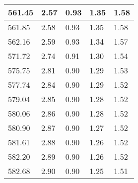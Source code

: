 \begin{table}[ht]
\begin{tabular}{|p{2.5cm}|p{2.5cm}|p{2.5cm}|p{2.5cm}|p{2.5cm}|}
        561.45                       & 2.57                         & 0.93                            & 1.35               & 1.58                            \\ \hline
        561.85                       & 2.58                         & 0.93                            & 1.35               & 1.58                            \\ \hline
        562.16                       & 2.59                         & 0.93                            & 1.34               & 1.57                            \\ \hline
        571.72                       & 2.74                         & 0.91                            & 1.30               & 1.54                            \\ \hline
        575.75                       & 2.81                         & 0.90                            & 1.29               & 1.53                            \\ \hline
        577.74                       & 2.84                         & 0.90                            & 1.29               & 1.52                            \\ \hline
        579.04                       & 2.85                         & 0.90                            & 1.28               & 1.52                            \\ \hline
        580.06                       & 2.86                         & 0.90                            & 1.28               & 1.52                            \\ \hline
        580.90                       & 2.87                         & 0.90                            & 1.27               & 1.52                            \\ \hline
        581.61                       & 2.88                         & 0.90                            & 1.26               & 1.52                            \\ \hline
        582.20                       & 2.89                         & 0.90                            & 1.26               & 1.52                            \\ \hline
        582.68                       & 2.90                         & 0.90                            & 1.25               & 1.51                            \\ \hline
    \end{tabular}
\end{table}

